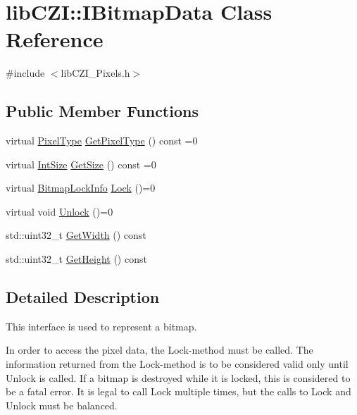 \hypertarget{classlib_c_z_i_1_1_i_bitmap_data}{}\section{lib\+C\+ZI\+:\+:I\+Bitmap\+Data Class Reference}
\label{classlib_c_z_i_1_1_i_bitmap_data}


{\ttfamily \#include $<$lib\+C\+Z\+I\+\_\+\+Pixels.\+h$>$}

\subsection*{Public Member Functions}
\begin{DoxyCompactItemize}
\item 
virtual \hyperlink{namespacelib_c_z_i_abf8ce12ab88b06c8b3b47efbb5e2e834}{Pixel\+Type} \hyperlink{classlib_c_z_i_1_1_i_bitmap_data_a66f27266674d7f328dd5f1270b81a94e}{Get\+Pixel\+Type} () const =0
\item 
virtual \hyperlink{structlib_c_z_i_1_1_int_size}{Int\+Size} \hyperlink{classlib_c_z_i_1_1_i_bitmap_data_af612716947147a55dcbbb245c3335ace}{Get\+Size} () const =0
\item 
virtual \hyperlink{structlib_c_z_i_1_1_bitmap_lock_info}{Bitmap\+Lock\+Info} \hyperlink{classlib_c_z_i_1_1_i_bitmap_data_afbdfc7266b37850cfb53d5106bfd4f44}{Lock} ()=0
\item 
virtual void \hyperlink{classlib_c_z_i_1_1_i_bitmap_data_a473c706c604fd687fb653bd06f0e0356}{Unlock} ()=0
\item 
std\+::uint32\+\_\+t \hyperlink{classlib_c_z_i_1_1_i_bitmap_data_aa2638991a88c736ff4e6c42dc4c6c5c7}{Get\+Width} () const
\item 
std\+::uint32\+\_\+t \hyperlink{classlib_c_z_i_1_1_i_bitmap_data_a2072b5c8db493b7b19717811a96a6483}{Get\+Height} () const
\end{DoxyCompactItemize}


\subsection{Detailed Description}
This interface is used to represent a bitmap.

In order to access the pixel data, the Lock-\/method must be called. The information returned from the Lock-\/method is to be considered valid only until Unlock is called. If a bitmap is destroyed while it is locked, this is considered to be a fatal error. It is legal to call Lock multiple times, but the calls to Lock and Unlock must be balanced. 

